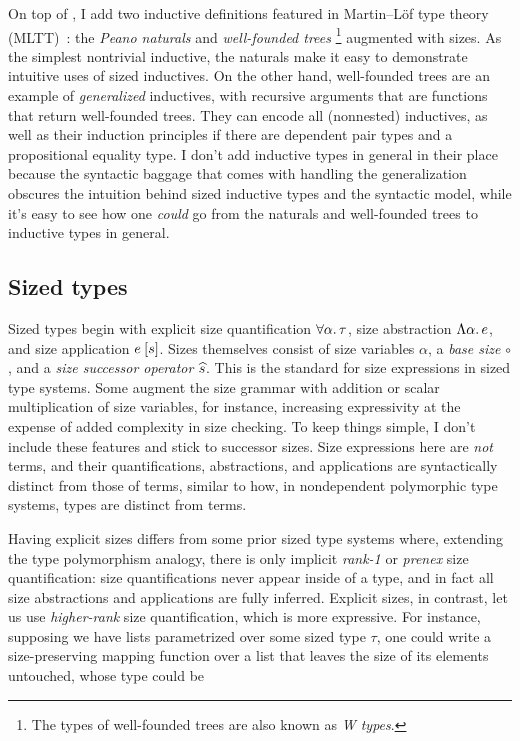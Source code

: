 On top of \GCC, I add two inductive definitions featured in Martin--L\"of type theory (MLTT)~\citep{MLTT}:
the \emph{Peano naturals} and \emph{well-founded trees}\punctstack{,}%
\footnote{The types of well-founded trees are also known as \emph{W types}.}
augmented with sizes.
As the simplest nontrivial inductive,
the naturals make it easy to demonstrate intuitive uses of sized inductives.
On the other hand, well-founded trees are an example of \emph{generalized} inductives,
with recursive arguments that are functions that return well-founded trees.
They can encode all (nonnested) inductives,
as well as their induction principles \citep{whynotW} if there are dependent pair types
and a propositional equality type.
I don't add inductive types in general in their place
because the syntactic baggage that comes with handling the generalization
obscures the intuition behind sized inductive types and the syntactic model,
while it's easy to see how one \emph{could} go from the naturals and well-founded trees
to inductive types in general.

\subsection{Sized types}\label{sec:sized-types}

Sized types begin with explicit size quantification $\forall \alpha \mathpunct{.} \tau$,
size abstraction $\Lambda \alpha \mathpunct{.} e$, and size application $\App{e}{s}$.
Sizes themselves consist of size variables $\alpha$, a \emph{base size} $\circ$,
and a \emph{size successor operator} $\widehat{s}$.
This is the standard for size expressions in sized type systems.
Some augment the size grammar with addition or scalar multiplication of size variables,
for instance, increasing expressivity at the expense of added complexity in size checking.
To keep things simple, I don't include these features and stick to successor sizes.
Size expressions here are \emph{not} terms,
and their quantifications, abstractions, and applications
are syntactically distinct from those of terms,
similar to how, in nondependent polymorphic type systems,
types are distinct from terms.

Having explicit sizes differs from some prior sized type systems where,
extending the type polymorphism analogy,
there is only implicit \emph{rank-1} or
\emph{prenex} size quantification:
size quantifications never appear inside of a type,
and in fact all size abstractions and applications are fully inferred.
Explicit sizes, in contrast, let us use
\emph{higher-rank} size quantification,
which is more expressive.
For instance, supposing we have lists parametrized over some sized type $\tau$,
one could write a size-preserving mapping function over a list
that leaves the size of its elements untouched, whose type could be

